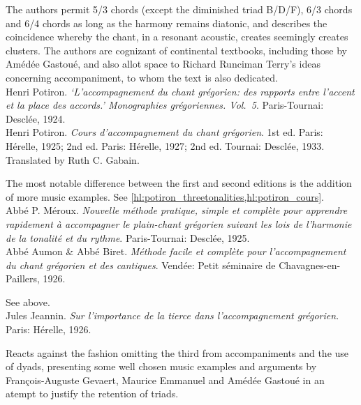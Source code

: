      \parindent=20pt
     \hangindent=20pt
     The authors permit 5/3 chords (except the diminished triad B/D/F), 6/3 chords and 6/4 chords as long as the harmony remains diatonic, and describes the coincidence whereby the chant, in a resonant acoustic, creates seemingly creates clusters. The authors are cognizant of continental textbooks, including those by Amédée Gastoué, and also allot space to Richard Runciman Terry's ideas concerning accompaniment, to whom the text is also dedicated.\\

    \parindent=0pt
    \hangindent=0pt
  \covid{}Henri Potiron. \emph{\emph{`L'accompagnement du chant grégorien: des rapports entre l'accent et la place des accords.'} Monographies grégoriennes. \emph{Vol.~5}}. Paris-Tournai:  Desclée, 1924. \\

    \parindent=0pt
    \hangindent=0pt
  Henri Potiron. \emph{Cours d'accompagnement du chant grégorien}. 1st ed. Paris:  Hérelle, 1925;  2nd ed. Paris:  Hérelle, 1927;  2nd ed. Tournai:  Desclée, 1933. Translated by Ruth C. Gabain.

     \parindent=20pt
     \hangindent=20pt
     The most notable difference between the first and second editions is the addition of more music examples. See \cref{hl:potiron_threetonalities,hl:potiron_cours}.\\

    \parindent=0pt
    \hangindent=0pt
  \covid{}Abbé P. Méroux. \emph{Nouvelle méthode pratique, simple et complète pour apprendre rapidement à accompagner le plain-chant grégorien suivant les lois de l'harmonie de la tonalité et du rythme}. Paris-Tournai:  Desclée, 1925. \\

    \parindent=0pt
    \hangindent=0pt
  Abbé Aumon \& Abbé Biret. \emph{Méthode facile et complète pour l'accompagnement du chant grégorien et des cantiques}. Vendée:  Petit séminaire de Chavagnes-en-Paillers, 1926.

     \parindent=20pt
     \hangindent=20pt
     See  above.\\

    \parindent=0pt
    \hangindent=0pt
  Jules Jeannin. \emph{Sur l'importance de la tierce dans l'accompagnement grégorien}. Paris:  Hérelle, 1926.

     \parindent=20pt
     \hangindent=20pt
     Reacts against the fashion omitting the third from accompaniments and the use of dyads, presenting some well chosen music examples and arguments by François-Auguste Gevaert, Maurice Emmanuel and Amédée Gastoué in an atempt to justify the retention of triads. \\

